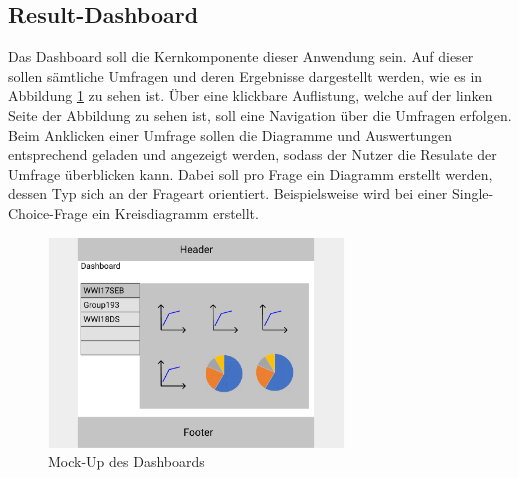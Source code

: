 \subsection{Result-Dashboard}
\label{ssec:konzept:client:dashboard}

Das Dashboard soll die Kernkomponente dieser Anwendung sein. 
Auf dieser sollen sämtliche Umfragen und deren Ergebnisse dargestellt werden, wie es in Abbildung \ref{fig:MockDashboard} zu sehen ist.
Über eine klickbare Auflistung, welche auf der linken Seite der Abbildung zu sehen ist, soll eine Navigation über die Umfragen erfolgen.
Beim Anklicken einer Umfrage sollen die Diagramme und Auswertungen entsprechend geladen und angezeigt werden, sodass der Nutzer die Resulate der Umfrage überblicken kann.
Dabei soll pro Frage ein Diagramm erstellt werden, dessen Typ sich an der Frageart orientiert.
Beispielsweise wird bei einer Single-Choice-Frage ein Kreisdiagramm erstellt.

\begin{figure}[h]
	\centering
	\includegraphics[width=0.7\textwidth]{img/konzeption/client/dashboard}
	\captionsetup{justification=centering, format=plain}
	\caption[Mock-Up des Dashboards]{Mock-Up des Dashboards \\\figma}
	\label{fig:MockDashboard}
\end{figure}

